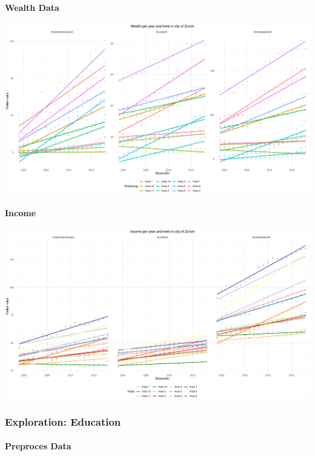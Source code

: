 \documentclass[
]{article}
\begin{document}
\hypertarget{wealth-data}{%
\paragraph{Wealth Data}\label{wealth-data}}

\includegraphics{report_files/figure-latex/plot_wealth-1.pdf}

\hypertarget{income}{%
\paragraph{Income}\label{income}}

\includegraphics{report_files/figure-latex/plot_income-1.pdf}

\hypertarget{exploration-education}{%
\subsubsection{Exploration: Education}\label{exploration-education}}

\hypertarget{preproces-data}{%
\paragraph{Preproces Data}\label{preproces-data}}
\end{document}
